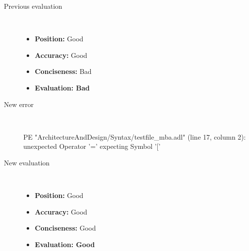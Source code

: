\begin{description}
\begin{haskell}
\end{haskell}
  \item[Previous evaluation]~\\
    \begin{itemize}
    \item \textbf{Position:} Good
    \item \textbf{Accuracy:} Good
    \item \textbf{Conciseness:} Bad
    \item \textbf{Evaluation: Bad}
    \end{itemize}
  \item[New error]~\\
\begin{haskell}
PE "ArchitectureAndDesign/Syntax/testfile_mba.adl" (line 17, column 2):
unexpected Operator '='
expecting Symbol '['\end{haskell}
  \item[New evaluation]~\\
    \begin{itemize}
    \item \textbf{Position:} Good
    \item \textbf{Accuracy:} Good
    \item \textbf{Conciseness:} Good
    \item \textbf{Evaluation: Good}
    \end{itemize}
  \end{description}

\hrulefill

